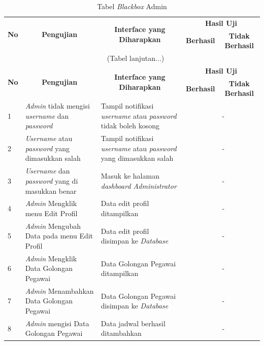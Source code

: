 \begin{enumerate}
{	\begin{longtable}{p{0.5cm} p{4cm} p{4cm} p{0.5cm} p{1cm}}
		\caption{Tabel \textit{Blackbox} Admin}
		\label{blackboxtesting}\\ 
		\hline
		\multicolumn{1}{c}{\multirow{2}{*}{\textbf{No}}} & \multicolumn{1}{c}{\multirow{2}{*}{\textbf{Pengujian}}} & \multicolumn{1}{c}{\multirow{2}{*}{\textbf{Interface yang Diharapkan}}} & \multicolumn{2}{c}{\textbf{Hasil Uji}} \\ \cline{4-5} 
		\multicolumn{1}{c}{} & \multicolumn{1}{c}{} & \multicolumn{1}{c}{} & \multicolumn{1}{c}{\textbf{Berhasil}} & \multicolumn{1}{c}{\textbf{Tidak Berhasil}} \\ \hline
		\endfirsthead
		\multicolumn{5}{c}{\tablename\ \thetable\ \namaTabel \space (Tabel
			lanjutan...)} \\
		\hline
		\multicolumn{1}{c}{\multirow{2}{*}{\textbf{No}}} & \multicolumn{1}{c}{\multirow{2}{*}{\textbf{Pengujian}}} & \multicolumn{1}{c}{\multirow{2}{*}{\textbf{Interface yang Diharapkan}}} & \multicolumn{2}{c}{\textbf{Hasil Uji}} \\ \cline{4-5} 
		\multicolumn{1}{c}{} & \multicolumn{1}{c}{} & \multicolumn{1}{c}{} & \multicolumn{1}{c}{\textbf{Berhasil}} & \multicolumn{1}{c}{\textbf{Tidak Berhasil}} \\ \hline
		\endhead
		1 & \textit{Admin} tidak mengisi \textit{username} dan \textit{password} & Tampil notifikasi \textit{username} atau \textit{password} tidak boleh kosong & \checkmark & -\\
		2 & \textit{Username} atau \textit{password} yang dimasukkan salah & Tampil notifikasi \textit{username} atau \textit{password} yang dimasukkan salah & \checkmark & -\\
		3 & \textit{Username} dan \textit{password} yang di masukkan benar & Masuk ke halaman \textit{dashboard Administrator} & \checkmark & -\\
		4 & \textit{Admin} Mengklik menu Edit Profil  & Data edit profil ditampilkan & \checkmark & -\\
		5 & \textit{Admin} Mengubah Data pada  menu Edit Profil  & Data edit profil disimpan ke \textit{Database} & \checkmark & -\\
		6 & \textit{Admin} Mengklik Data Golongan Pegawai & Data Golongan Pegawai ditampilkan & \checkmark & -\\
		7 & \textit{Admin} Menambahkan Data Golongan Pegawai & Data Golongan Pegawai disimpan ke \textit{Database}  & \checkmark & -\\
		8 & \textit{Admin} mengisi Data Golongan Pegawai & Data jadwal berhasil ditambahkan & \checkmark & -\\

\end{longtable}}
\end{enumerate}
